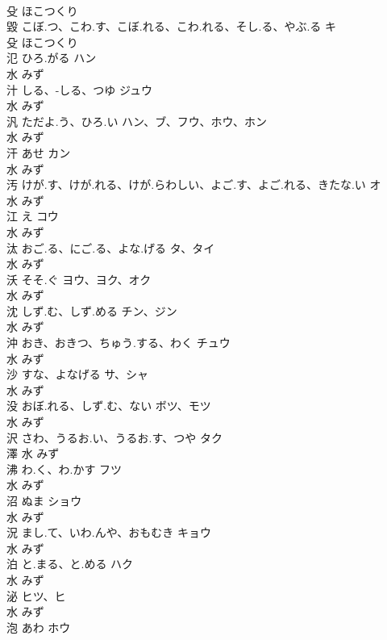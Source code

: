 \documentclass[8pt]{extreport}
\begin{document}
\begin{CJK}{UTF8}{min}
\\	殳		ほこつくり		
\\	毀	こぼ.つ、こわ.す、こぼ.れる、こわ.れる、そし.る、やぶ.る	キ	
\\	殳		ほこつくり		
\\	氾	ひろ.がる	ハン	
\\	水		みず		
\\	汁	しる、-しる、つゆ	ジュウ	
\\	水		みず		
\\	汎	ただよ.う、ひろ.い	ハン、ブ、フウ、ホウ、ホン	
\\	水		みず		
\\	汗	あせ	カン	
\\	水		みず		
\\	汚	けが.す、けが.れる、けが.らわしい、よご.す、よご.れる、きたな.い	オ	
\\	水		みず		
\\	江	え	コウ	
\\	水		みず		
\\	汰	おご.る、にご.る、よな.げる	タ、タイ	
\\	水		みず		
\\	沃	そそ.ぐ	ヨウ、ヨク、オク	
\\	水		みず		
\\	沈	しず.む、しず.める	チン、ジン	
\\	水		みず		
\\	沖	おき、おきつ、ちゅう.する、わく	チュウ	
\\	水		みず		
\\	沙	すな、よなげる	サ、シャ	
\\	水		みず		
\\	没	おぼ.れる、しず.む、ない	ボツ、モツ	
\\	水		みず		
\\	沢	さわ、うるお.い、うるお.す、つや	タク	
\\	澤	水		みず		
\\	沸	わ.く、わ.かす	フツ	
\\	水		みず		
\\	沼	ぬま	ショウ	
\\	水		みず		
\\	況	まし.て、いわ.んや、おもむき	キョウ	
\\	水		みず		
\\	泊	と.まる、と.める	ハク	
\\	水		みず		
\\	泌		ヒツ、ヒ	
\\	水		みず		
\\	泡	あわ	ホウ	

\end{CJK}
\end{document}
